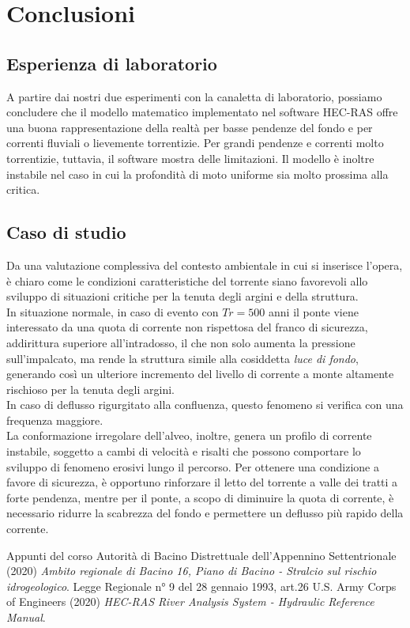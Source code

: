 \documentclass[12pt]{article} %
\begin{document}
\newpage
\section{Conclusioni}

\subsection{Esperienza di laboratorio}

\noindent A partire dai nostri due esperimenti con la canaletta di laboratorio, possiamo concludere che il modello matematico implementato nel software HEC-RAS offre una buona rappresentazione della realtà per basse pendenze del fondo e per correnti fluviali o lievemente torrentizie. Per grandi pendenze e correnti molto torrentizie, tuttavia, il software mostra delle limitazioni. Il modello è inoltre instabile nel caso in cui la profondità di moto uniforme sia molto prossima alla critica.

\subsection{Caso di studio}

\noindent Da una valutazione complessiva del contesto ambientale in cui si inserisce l'opera, è chiaro come le condizioni caratteristiche del torrente siano favorevoli allo sviluppo di situazioni critiche per la tenuta degli argini e della struttura.\\
In situazione normale, in caso di evento con $Tr=500$ anni il ponte viene interessato da una quota di corrente non rispettosa del franco di sicurezza, addirittura superiore all'intradosso, il che non solo aumenta la pressione sull'impalcato, ma rende la struttura simile alla cosiddetta \textit{luce di fondo}, generando così un ulteriore incremento del livello di corrente a monte altamente rischioso per la tenuta degli argini.\\
In caso di deflusso rigurgitato alla confluenza, questo fenomeno si verifica con una frequenza maggiore.\\
La conformazione irregolare dell'alveo, inoltre, genera un profilo di corrente instabile, soggetto a cambi di velocità e risalti che possono comportare lo sviluppo di fenomeno erosivi lungo il percorso.
Per ottenere una condizione a favore di sicurezza, è opportuno rinforzare il letto del torrente a valle dei tratti a forte pendenza, mentre per il ponte, a scopo di diminuire la quota di corrente, è necessario ridurre la scabrezza del fondo e permettere un deflusso più rapido della corrente.

\newpage
\begin{thebibliography}{}
Appunti del corso
 Autorità di Bacino Distrettuale dell'Appennino Settentrionale (2020) \textit{Ambito regionale di Bacino 16, Piano di Bacino - Stralcio sul rischio idrogeologico}.
 Legge Regionale n° 9 del 28 gennaio 1993, art.26
U.S. Army Corps of Engineers (2020) \textit{HEC-RAS River Analysis System - Hydraulic Reference Manual}. 
 
\end{thebibliography}
\end{document}
